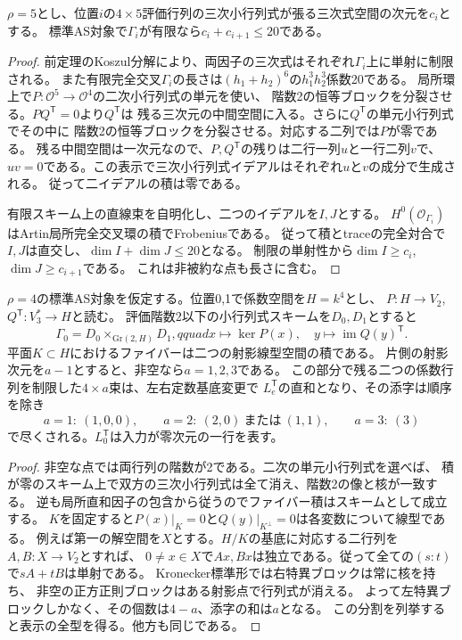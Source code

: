 \begin{corollary}\label{cor:rho-five-minor-budget}
$\rho=5$とし、位置$i$の$4\times5$評価行列の三次小行列式が張る三次式空間の次元を$c_i$とする。
標準AS対象で$\Gamma_i$が有限なら$c_i+c_{i+1}\le20$である。
\end{corollary}
\begin{proof}
前定理のKoszul分解により、両因子の三次式はそれぞれ$\Gamma_i$上に単射に制限される。
また有限完全交叉$\Gamma_i$の長さは$(h_1+h_2)^6$の$h_1^3 h_2^3$係数20である。
局所環上で$P: \mathcal O^5\to\mathcal O^4$の二次小行列式の単元を使い、
階数2の恒等ブロックを分裂させる。$PQ^{\mathsf T}=0$より$Q^{\mathsf T}$は
残る三次元の中間空間に入る。さらに$Q^{\mathsf T}$の単元小行列式でその中に
階数2の恒等ブロックを分裂させる。対応する二列では$P$が零である。
残る中間空間は一次元なので、$P,Q^{\mathsf T}$の残りは二行一列$u$と一行二列$v$で、
$uv=0$である。この表示で三次小行列式イデアルはそれぞれ$u$と$v$の成分で生成される。
従って二イデアルの積は零である。

有限スキーム上の直線束を自明化し、二つのイデアルを$I,J$とする。
$H^0(\mathcal O_{\Gamma_i})$はArtin局所完全交叉環の積でFrobeniusである。
従って積とtraceの完全対合で$I,J$は直交し、$\dim I+\dim J\le20$となる。
制限の単射性から$\dim I\ge c_i$, $\dim J\ge c_{i+1}$である。
これは非被約な点も長さに含む。
\end{proof}

\begin{proposition}[階数4の平面の照合と定数ファイバーの全型]\label{prop:rho-four-plane-fibers}
$\rho=4$の標準AS対象を仮定する。位置0,1で係数空間を$H=k^4$とし、
$P:H\to V_2$, $Q^{\mathsf T}:V_3^*\to H$と読む。
評価階数2以下の小行列式スキームを$D_0,D_1$とすると
\[
 \Gamma_0=D_0\mathbin{\times}_{\mathrm{Gr}(2,H)}D_1,qquad
 x\longmapsto\ker P(x),\quad y\longmapsto\operatorname{im}Q(y)^{\mathsf T}.
\]
平面$K\subset H$におけるファイバーは二つの射影線型空間の積である。
片側の射影次元を$a-1$とすると、非空なら$a=1,2,3$である。
この部分で残る二つの係数行列を制限した$4\times a$束は、左右定数基底変更で
$L_e^{\mathsf T}$の直和となり、その添字は順序を除き
\[
 a=1:\ (1,0,0),\qquad a=2:\ (2,0)\ \text{または}\ (1,1),\qquad a=3:\ (3)
\]
で尽くされる。$L_0^{\mathsf T}$は入力が零次元の一行を表す。
\end{proposition}
\begin{proof}
非空な点では両行列の階数が2である。二次の単元小行列式を選べば、
積が零のスキーム上で双方の三次小行列式は全て消え、階数2の像と核が一致する。
逆も局所直和因子の包含から従うのでファイバー積はスキームとして成立する。
$K$を固定すると$P(x)|_K=0$と$Q(y)|_{K^\perp}=0$は各変数について線型である。
例えば第一の解空間を$X$とする。$H/K$の基底に対応する二行列を$A,B:X\to V_2$とすれば、
$0\ne x\in X$で$A x,B x$は独立である。従って全ての$(s:t)$で$sA+tB$は単射である。
Kronecker標準形\cite[Theorem 1]{DDLpencils}では右特異ブロックは常に核を持ち、
非空の正方正則ブロックはある射影点で行列式が消える。
よって左特異ブロックしかなく、その個数は$4-a$、添字の和は$a$となる。
この分割を列挙すると表示の全型を得る。他方も同じである。
\end{proof}

